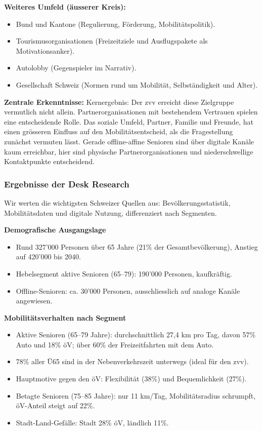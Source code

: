 \textbf{Weiteres Umfeld (äusserer Kreis):}
\begin{itemize}
  \item Bund und Kantone (Regulierung, Förderung, Mobilitätspolitik).
  \item Tourismusorganisationen (Freizeitziele und Ausflugspakete als Motivationsanker).
  \item Autolobby (Gegenspieler im Narrativ).
  \item Gesellschaft Schweiz (Normen rund um Mobilität, Selbständigkeit und Alter).
\end{itemize}

\textbf{Zentrale Erkenntnisse:}
Kernergebnis: Der \gls{zvv} erreicht diese Zielgruppe vermutlich nicht allein.
Partnerorganisationen mit bestehendem Vertrauen spielen eine entscheidende Rolle.
Das soziale Umfeld, Partner, Familie und Freunde, hat einen grösseren Einfluss auf den Mobilitätsentscheid, als die Fragestellung zunächst vermuten lässt.
Gerade offline-affine Senioren sind über digitale Kanäle kaum erreichbar, hier sind physische Partnerorganisationen und niederschwellige Kontaktpunkte entscheidend.


\subsubsection{Ergebnisse der Desk Research}

Wir werten die wichtigsten Schweizer Quellen aus: Bevölkerungsstatistik, Mobilitätsdaten und digitale Nutzung, differenziert nach Segmenten.

\textbf{Demografische Ausgangslage} \parencite{statzh2023,zvvbriefing2026}
\begin{itemize}
  \item Rund 327'000 Personen über 65 Jahre (21\% der Gesamtbevölkerung), Anstieg auf 420'000 bis 2040.
  \item Hebelsegment aktive Senioren (65--79): 190'000 Personen, kaufkräftig.
  \item Offline-Senioren: ca. 30'000 Personen, ausschliesslich auf analoge Kanäle angewiesen.
\end{itemize}

\textbf{Mobilitätsverhalten nach Segment} \parencite{bfsare2021,zvvbriefing2026}
\begin{itemize}
  \item Aktive Senioren (65--79 Jahre): durchschnittlich 27,4 km pro Tag, davon 57\% Auto und 18\% öV; über 60\% der Freizeitfahrten mit dem Auto.
  \item 78\% aller Ü65 sind in der Nebenverkehrszeit unterwegs (ideal für den \gls{zvv}).
  \item Hauptmotive gegen den öV: Flexibilität (38\%) und Bequemlichkeit (27\%).
  \item Betagte Senioren (75--85 Jahre): nur 11 km/Tag, Mobilitätsradius schrumpft, öV-Anteil steigt auf 22\%.
  \item Stadt-Land-Gefälle: Stadt 28\% öV, ländlich 11\%.
\end{itemize}

